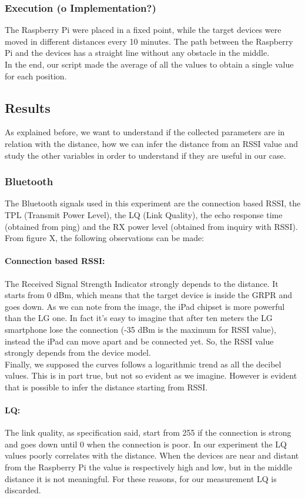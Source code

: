 \subsubsection{Execution (o Implementation?)}
The Raspberry Pi were placed in a fixed point, while the target devices were moved in different distances every 10 minutes. The path between the Raspberry Pi and the devices has a straight line without any obstacle in the middle.\\
In the end, our script made the average of all the values to obtain a single value for each position.
\subsection{Results}
As explained before, we want to understand if the collected parameters are in relation with the distance, how we can infer the distance from an RSSI value and study the other variables in order to understand if they are useful in our case.\\
\subsubsection{Bluetooth}
The Bluetooth signals used in this experiment are the connection based RSSI, the TPL (Transmit Power Level), the LQ (Link Quality), the echo response time (obtained from ping) and the RX power level (obtained from inquiry with RSSI).\\
From figure X, the following observations can be made:
\paragraph{Connection based RSSI:} The Received Signal Strength Indicator strongly depends to the distance. It starts from 0 dBm, which means that the target device is inside the GRPR and goes down. As we can note from the image, the iPad chipset is more powerful than the LG one. In fact it's easy to imagine that after ten meters the LG smartphone lose the connection (-35 dBm is the maximum for RSSI value), instead the iPad can move apart and be connected yet. So, the RSSI value strongly depends from the device model.\\
Finally, we supposed the curves follows a logarithmic trend as all the decibel values. This is in part true, but not so evident as we imagine. However is evident that is possible to infer the distance starting from RSSI.
\paragraph{LQ:} The link quality, as specification said, start from 255 if the connection is strong and goes down until 0 when the connection is poor. In our experiment the LQ values poorly correlates with the distance. When the devices are near and distant from the Raspberry Pi the value is respectively high and low, but in the middle distance it is not meaningful. For these reasons, for our measurement LQ is discarded.
